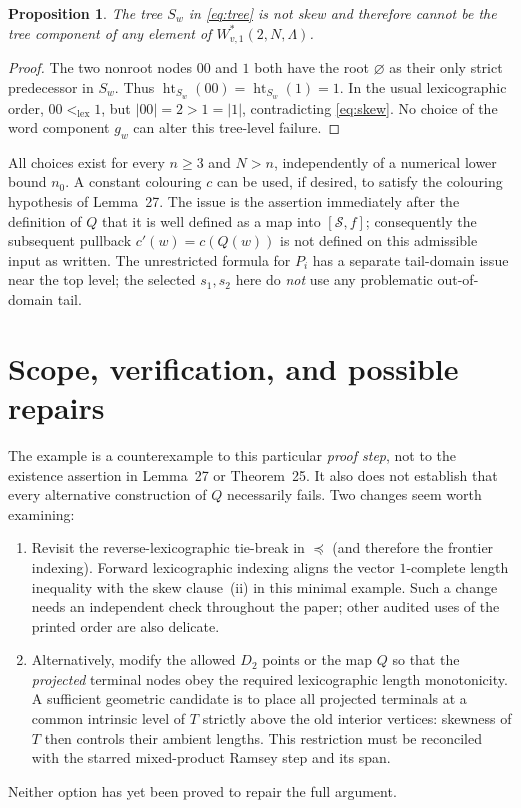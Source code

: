 \documentclass[11pt,a4paper]{article}
\newtheorem{proposition}{Proposition}
\newcommand{\eps}{\varnothing}
\newcommand{\lv}{\operatorname{ht}}
\begin{document}
\begin{proposition}
The tree $S_w$ in \eqref{eq:tree} is not skew and therefore cannot be
the tree component of any element of $W^*_{v,1}(2,N,\Lambda)$.
\end{proposition}
\begin{proof}
The two nonroot nodes $00$ and $1$ both have the root $\eps$
as their only strict predecessor in $S_w$. Thus
$\lv_{S_w}(00)=\lv_{S_w}(1)=1$. In the usual lexicographic order,
$00<_{\mathrm{lex}}1$, but $|00|=2>1=|1|$, contradicting
\eqref{eq:skew}. No choice of the word component $g_w$ can alter
this tree-level failure.
\end{proof}

All choices exist for every $n\geq3$ and $N>n$, independently of a
numerical lower bound $n_0$. A constant colouring $c$ can be used,
if desired, to satisfy the colouring hypothesis of Lemma~27.
The issue is the assertion immediately after the definition of $Q$
that it is well defined as a map into $[\mathcal S,f]$;
consequently the subsequent pullback $c'(w)=c(Q(w))$ is not defined
on this admissible input as written. The unrestricted formula
for $P_i$ has a separate tail-domain issue near the top level;
the selected $s_1,s_2$ here do \emph{not} use any problematic
out-of-domain tail.

\section*{Scope, verification, and possible repairs}
The example is a counterexample to this particular \emph{proof step},
not to the existence assertion in Lemma~27 or Theorem~25.
It also does not establish that every alternative construction of $Q$
necessarily fails. Two changes seem worth examining:
\begin{enumerate}[leftmargin=1.8em,itemsep=2pt]
 \item Revisit the reverse-lexicographic tie-break in $\preceq$
 (and therefore the frontier indexing). Forward lexicographic
 indexing aligns the vector $1$-complete length inequality with
 the skew clause~(ii) in this minimal example. Such a change needs
 an independent check throughout the paper; other audited uses of
 the printed order are also delicate.
 \item Alternatively, modify the allowed $D_2$ points or the map $Q$
 so that the \emph{projected} terminal nodes obey the required
 lexicographic length monotonicity. A sufficient geometric
 candidate is to place all projected terminals at a common intrinsic
 level of $T$ strictly above the old interior vertices: skewness of
 $T$ then controls their ambient lengths. This restriction must be
 reconciled with the starred mixed-product Ramsey step and its span.
\end{enumerate}
Neither option has yet been proved to repair the full argument.
\end{document}

